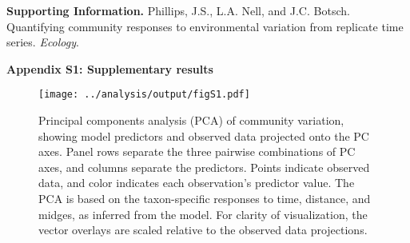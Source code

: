 \documentclass[12pt]{article}
\begin{document}
\raggedright

\textbf{Supporting Information.}
Phillips, J.S., L.A. Nell, and J.C. Botsch.
Quantifying community responses to environmental variation from replicate
time series.
\emph{Ecology}.

\vspace{12pt}

\textbf{Appendix S1: Supplementary results}

\vspace{24pt}


\begin{figure}[h!]
\centering
\texttt{[image: ../analysis/output/figS1.pdf]}
\caption{\label{fig:pca-supp}
Principal components analysis (PCA) of community variation, showing
model predictors and observed data projected onto the PC axes.
Panel rows separate the three pairwise combinations of PC axes, and
columns separate the predictors.
Points indicate observed data, and color indicates
each observation's predictor value.
The PCA is based on the taxon-specific responses to time, distance, and midges,
as inferred from the model.
For clarity of visualization, the vector overlays are scaled relative to
the observed data projections.
}
\end{figure}
\end{document}
